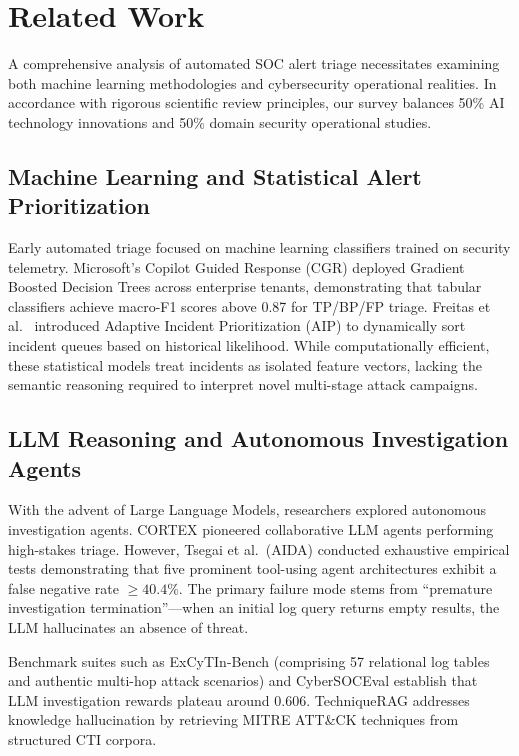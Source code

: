 \section{Related Work}

A comprehensive analysis of automated SOC alert triage necessitates examining both machine learning methodologies and cybersecurity operational realities. In accordance with rigorous scientific review principles, our survey balances 50\% AI technology innovations and 50\% domain security operational studies.

\subsection{Machine Learning and Statistical Alert Prioritization}
Early automated triage focused on machine learning classifiers trained on security telemetry. Microsoft's Copilot Guided Response (CGR) \cite{freitas2024cgr} deployed Gradient Boosted Decision Trees across enterprise tenants, demonstrating that tabular classifiers achieve macro-F1 scores above 0.87 for TP/BP/FP triage. Freitas et al.\ \cite{freitas2026aip} introduced Adaptive Incident Prioritization (AIP) to dynamically sort incident queues based on historical likelihood. While computationally efficient, these statistical models treat incidents as isolated feature vectors, lacking the semantic reasoning required to interpret novel multi-stage attack campaigns.

\subsection{LLM Reasoning and Autonomous Investigation Agents}
With the advent of Large Language Models, researchers explored autonomous investigation agents. CORTEX \cite{wei2025cortex} pioneered collaborative LLM agents performing high-stakes triage. However, Tsegai et al.\ (AIDA) \cite{tsegai2026aida} conducted exhaustive empirical tests demonstrating that five prominent tool-using agent architectures exhibit a false negative rate $\ge 40.4\%$. The primary failure mode stems from ``premature investigation termination''---when an initial log query returns empty results, the LLM hallucinates an absence of threat.

Benchmark suites such as ExCyTIn-Bench \cite{wu2026excytin} (comprising 57 relational log tables and authentic multi-hop attack scenarios) and CyberSOCEval \cite{deason2025cybersoceval} establish that LLM investigation rewards plateau around 0.606. TechniqueRAG \cite{lekssays2025techniquerag} addresses knowledge hallucination by retrieving MITRE ATT\&CK techniques from structured CTI corpora.

